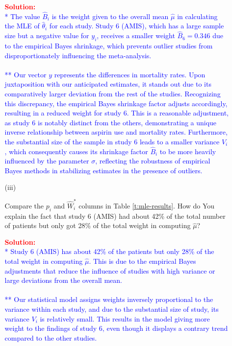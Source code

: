 \documentclass[12pt]{article}
\begin{document}
\begin{itemize}
\begin{itemize}
\textcolor{red}{\textbf{Solution:}} \\
\textcolor{blue}{
* The value \( \hat{B}_i \) is the weight given to the overall mean \( \hat{\mu} \) in calculating the MLE of \( \hat{\theta}_i \) for each study. Study 6 (AMIS), which has a large sample size but a negative value for \( y_i \), receives a smaller weight \( \hat{B}_6 = 0.346 \) due to the empirical Bayes shrinkage, which prevents outlier studies from disproportionately influencing the meta-analysis.
\\ \\
** Our vector \( y \) represents the differences in mortality rates. Upon juxtaposition with our anticipated estimates, it stands out due to its comparatively larger deviation from the rest of the studies. Recognizing this discrepancy, the empirical Bayes shrinkage factor adjusts accordingly, resulting in a reduced weight for study 6. This is a reasonable adjustment, as study 6 is notably distinct from the others, demonstrating a unique inverse relationship between aspirin use and mortality rates. Furthermore, the substantial size of the sample in study 6 leads to a smaller variance \( V_i \), which consequently causes its shrinkage factor \( \hat{B}_i \) to be more heavily influenced by the parameter \( \sigma \), reflecting the robustness of empirical Bayes methods in stabilizing estimates in the presence of outliers.
}

\item[(iii)]

Compare the $p_i$ and $\hat{ W }_i^*$ columns in Table \ref{t:mle-results}. How do You explain the fact that study 6 (AMIS) had about 42\% of the total number of patients but only got 28\% of the total weight in computing $\hat{ \mu }$? \textit{\fbox{\textbf{[10 points]}}}

\textcolor{red}{\textbf{Solution:}} \\
\textcolor{blue}{
* Study 6 (AMIS) has about 42\% of the patients but only 28\% of the total weight in computing \( \hat{\mu} \). This is due to the empirical Bayes adjustments that reduce the influence of studies with high variance or large deviations from the overall mean.
\\ \\ 
** Our statistical model assigns weights inversely proportional to the variance within each study, and due to the substantial size of study, its variance \( V_i \) is relatively small. This results in the model giving more weight to the findings of study 6, even though it displays a contrary trend compared to the other studies.
}


\end{itemize}
\end{itemize}
\end{document}

